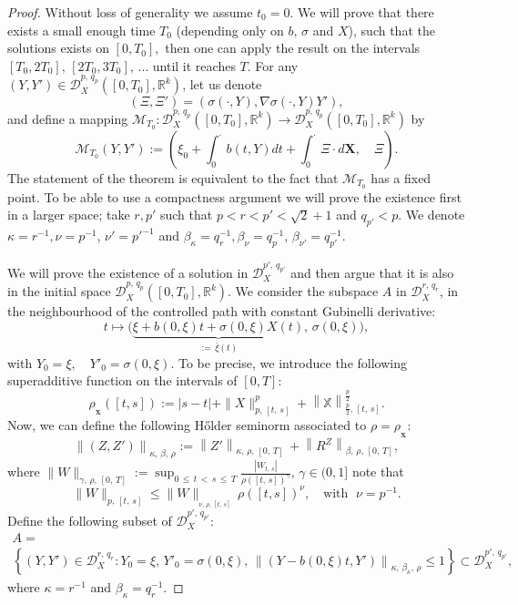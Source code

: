 \documentclass[AHL,Unicode,longabstracts,published]{cedram}
\newcommand{\bfX}{\mathbf{X}}
\newcommand{\scrD}{\mathscr{D}}
\newcommand{\bbX}{\mathbb{X}}
\newcommand{\calM}{\mathcal{M}}
\newcommand{\Rr}{{\mathbb{R}}}
\begin{document}
\begin{proof}
Without loss of generality we assume $t_0=0.$ We will prove that there exists a small enough time $T_0$ (depending only on $b,\,\sigma$ and $X$), such that the solutions exists on $[0,T_0],$ then one can apply the result on the intervals $[T_0,2T_0],\, [2T_0, 3T_0],\,\ldots$ until it reaches $T$. For any $(Y,Y')\in\scrD^{p,\,q_p}_{X}([0, T_0],\Rr^k)$, let us denote
\[
\left(\Xi,\Xi'\right)=\left(\sigma(\cdot,Y), \nabla \sigma(\cdot,Y) Y'\right),
\]
and define a mapping $\calM_{T_0}\colon \scrD^{p,\,q_p}_{X}([0, T_0],\Rr^k)\to \scrD^{p,\,q_p}_{X}([0, T_0],\Rr^k)$ by
\[
\calM_{T_0}\left(Y,Y'\right):=\left(\xi_0+\int_0^{\cdot} b(t, Y)dt+\int_0^{\cdot} \Xi\cdot d\bm{X},\quad \Xi\right).
\]
The statement of the theorem is equivalent to the fact that $\calM_{T_0}$ has a fixed point. To be able to use a compactness argument we will prove the existence first in a larger space; take $r, p'$ such that $p<r<p'<\sqrt{2}+1$ and $q_{p'}<p.$ We denote $\kappa=r^{-1}, \nu=p^{-1}$, $\nu'=p'^{-1}$ and $\beta_\kappa=q_r^{-1}, \beta_\nu=q_p^{-1}$, $\beta_{\nu'}=q_{p'}^{-1}.$

We will prove the existence of a solution in $\scrD^{p',\,q_{p'}}_{X }$ and then argue that it is also in the initial space $ \scrD^{p,\,q_p}_{X }([0, T_0],\Rr^k)$. We consider the subspace $A$ in $\scrD^{r,\,q_{r}}_{X}$, in the neighbourhood of the controlled path with constant Gubinelli derivative:
\[
t\mapsto \big(\underbrace{\xi+b(0,\xi) t+\sigma(0, \xi)X(t)}_{:=\,\bar{\xi}(t)},\, \sigma(0,\xi)\big),
\]
with $Y_0=\xi,\quad Y'_0=\sigma(0,\xi)$. To be precise, we introduce the following superadditive function on the intervals of $[0,T]$:
\[
\rho_{_\bfX}([t,s]):=|s-t|+\|X\|_{p,\,[t,\,s]}^p+\left\|\bbX\right\|_{\frac{p}{2},\,[t,\,s]}^{\frac p 2}.
\]
Now, we can define the following H\H older seminorm associated to $\rho=\rho_{_\bfX}$:
\[
\left\|\left(Z, Z'\right)\right\|_{\kappa,\,\beta,\,\rho}:=\left\|Z'\right\|_{\kappa,\,\rho,\, [0,\,T]}\,+\left\|R^Z\right\|_{\beta,\,\rho,\, [0,\,T]},
\]
where $\|W\|_{\gamma,\,\rho,\,[0,\,T]}:=\sup_{0\,\leq\,t\,<\,s\,\leq\,T} \frac{|W_{t,\,s}|}{\rho([t,\,s])^{\gamma}},\, \gamma\in (0, 1]$ note that
\[
\|W\|_{p,\,[t,\,s]} \leq \|W\|_{_{\nu,\,\rho,\,[t,\,s]}}\, \rho([t,s])^{\nu},\quad \text{
with }\;\nu=p^{-1}.
\]
Define the following subset of $\scrD^{p',\,q_{p'}}_{X }$:
\begin{multline}\label{eq.setA}
A=\\
\left\{\left(Y,Y'\right)\in\scrD^{r,\,q_{r}}_{X}\colon Y_0=\xi,\, Y'_0=\sigma(0,\xi),\, \left\|\left(Y-b(0,\xi) t,Y'\right)\right\|_{\kappa,\, \beta_{\kappa},\,\rho}\leq 1\right\} \subset \scrD^{p',\,q_{p'}}_{X}, 
\end{multline}
where $\kappa=r^{-1}$ and $\beta_\kappa=q_r^{-1}$.


\end{proof}
\end{document}
